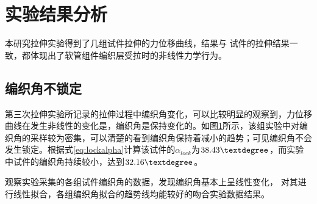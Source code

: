 \newpage



\section{实验结果分析}

本研究拉伸实验得到了几组试件拉伸的力位移曲线，结果与
\ha 试件的拉伸结果一致，都体现出了软管组件编织层受拉时的非线性力学行为。






\subsection{编织角不锁定}

第三次拉伸实验所记录的拉伸过程中编织角变化，可以比较明显的观察到，力位移曲线在发生非线性的变化是，编织角是保持变化的。如图\ref{fig:angle-conclusion}所示，该组实验中对编织角的采样较为密集，可以清楚的看到编织角保持着减小的趋势；可见编织角不会发生锁定。根据式\ref{eq:lockalpha}计算该试件的$ \alpha_{lock} $为$ 38.43\textdegree $，而实验中试件的编织角持续较小，达到$ 32.16\textdegree $。

\begin{figure}[!htb]
	\centering
	\label{fig:angle-conclusion}
\end{figure}

观察实验采集的各组试件编织角的数据，发现编织角基本上呈线性变化， 对其进行线性拟合，各组编织角拟合的趋势线均能较好的吻合实验数据结果。




